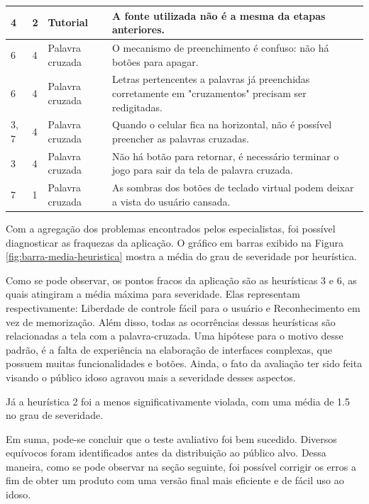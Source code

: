 \begin{table}[H]
\begin{tabular}{p{1.5cm} p{2cm} p{4cm} p{8.5cm}}
\\ \midrule
4
& 
2
&
Tutorial
&
A fonte utilizada não é a mesma da etapas anteriores.
\\ \midrule
6
& 
4
&
Palavra cruzada
&
O mecanismo de preenchimento é confuso: não há botões para apagar.
\\ \midrule
6
& 
4
&
Palavra cruzada
&
Letras pertencentes a palavras já preenchidas corretamente em "cruzamentos" precisam ser redigitadas.
\\ \midrule
3, 7
& 
4
&
Palavra cruzada
&
Quando o celular fica na horizontal, não é possível preencher as palavras cruzadas.
\\ \midrule
3
& 
4
&
Palavra cruzada
&
Não há botão para retornar, é necessário terminar o jogo para sair da tela de palavra cruzada.
\\ \midrule
7
& 
1
&
Palavra cruzada
&
As sombras dos botões de teclado virtual podem deixar a vista do usuário cansada.
\\ \bottomrule

\end{tabular}
\label{tab:avaliacaonielsen}
\end{table}

Com a agregação dos problemas encontrados pelos especialistas, foi possível diagnosticar as fraquezas da aplicação. O gráfico em barras exibido na Figura \ref{fig:barra-media-heuristica} mostra a média do grau de severidade por heurística.

Como se pode observar, os pontos fracos da aplicação são as heurísticas 3 e 6, as quais atingiram a média máxima para severidade. Elas representam respectivamente: Liberdade de controle fácil para o usuário e Reconhecimento em vez de memorização. Além disso, todas as ocorrências dessas heurísticas são relacionadas a tela com a palavra-cruzada. Uma hipótese para o motivo desse padrão, é a falta de experiência na elaboração de interfaces complexas, que possuem muitas funcionalidades e botões. Ainda, o fato da avaliação ter sido feita visando o público idoso agravou mais a severidade desses aspectos. 

Já a heurística 2 foi a menos significativamente violada, com uma média de 1.5 no grau de severidade.

Em suma, pode-se concluir que o teste avaliativo foi bem sucedido. Diversos equívocos foram identificados antes da distribuição ao público alvo. Dessa maneira, como se pode observar na seção seguinte, foi possível corrigir os erros a fim de obter um produto com uma versão final mais eficiente e de fácil uso ao idoso.

